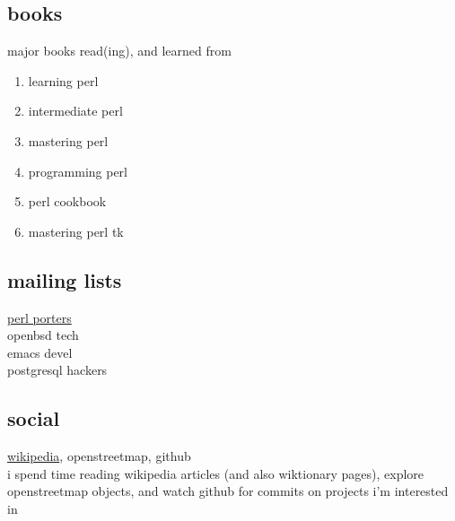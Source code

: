 \documentclass{article}
\begin{document}
\subsection{books}
major books read(ing), and learned from
\begin{enumerate}
\item{learning perl\cite{learning_perl}}
\item{intermediate perl\cite{intermediate_perl}}
\item{mastering perl\cite{mastering_perl}}
\item{programming perl\cite{programming_perl}}
\item{perl cookbook\cite{perl_cookbook}}
\item{mastering perl tk\cite{perl_tk}}
\end{enumerate}
\subsection{mailing lists}
\begin{description}
\item[\href{https://lists.perl.org/list/perl5-porters.html}{perl porters}]
\item[openbsd tech]
\item[emacs devel]
\item[postgresql hackers]
\end{description}
\subsection{social}
\href{https://en.wikipedia.org/wiki/User:Rwp0}{wikipedia}, openstreetmap, github\\
i spend time reading wikipedia articles (and also wiktionary pages), explore openstreetmap objects, and watch github for commits  on projects i'm interested in
{} %
% 
\end{document}
